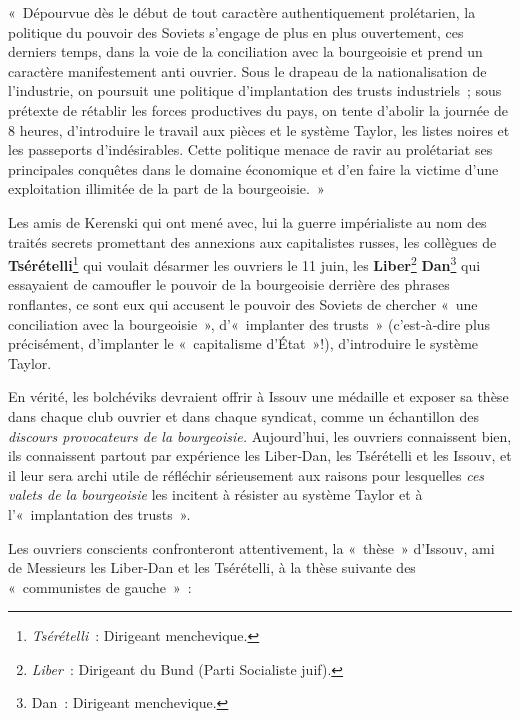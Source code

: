 \documentclass[french,twoside]{book} %
\def\mednobreak{\ifdim\lastskip<\medskipamount
  \removelastskip\nopagebreak\medskip\fi}
\newcommand{\labelblock}[1]{\medbreak{\noindent\color{rubric}\bfseries #1}\par\mednobreak}
\newenvironment{quoteblock}%
  {\begin{quoting}}
  {\end{quoting}}
\newenvironment{quotebar}{%
    \def\FrameCommand{{\color{rubric!10!}\vrule width 0.5em} \hspace{0.9em}}%
    \def\OuterFrameSep{\itemsep} %
    \MakeFramed {\advance\hsize-\width \FrameRestore}
  }%
  {%
    \endMakeFramed
  }
\renewenvironment{quoteblock}%
  {%
    \savenotes
    \setstretch{0.9}
    \normalfont
    \begin{quotebar}
  }
  {%
    \end{quotebar}
    \spewnotes
  }
\begin{document}
\begin{quoteblock}
 \noindent « Dépourvue dès le début de tout caractère authentiquement prolétarien, la politique du pouvoir des Soviets s’engage de plus en plus ouvertement, ces derniers temps, dans la voie de la conciliation avec la bourgeoisie et prend un caractère manifestement anti ouvrier. Sous le drapeau de la nationalisation de l’industrie, on poursuit une politique d’implantation des trusts industriels ; sous prétexte de rétablir les forces productives du pays, on tente d’abolir la journée de 8 heures, d’introduire le travail aux pièces et le système Taylor, les listes noires et les passeports d’indésirables. Cette politique menace de ravir au prolétariat ses principales conquêtes dans le domaine économique et d’en faire la victime d’une exploitation illimitée de la part de la bourgeoisie. »
\end{quoteblock}


\labelblock{N'est‑ce pas magnifique ?}

\noindent Les amis de Kerenski qui ont mené avec, lui la guerre impérialiste au nom des traités secrets promettant des annexions aux capitalistes russes, les collègues de \textbf{Tsérételli}\footnote{\emph{Tsérételli} : Dirigeant menchevique.} qui voulait désarmer les ouvriers le 11 juin, les \textbf{Liber}\footnote{\emph{Liber} : Dirigeant du Bund (Parti Socialiste juif).}\textbf{ Dan}\footnote{Dan : Dirigeant menchevique.} qui essayaient de camoufler le pouvoir de la bourgeoisie derrière des phrases ronflantes, ce sont eux qui accusent le pouvoir des Soviets de chercher « une conciliation avec la bourgeoisie », d’« implanter des trusts » (c’est‑à‑dire plus précisément, d’implanter le \hspace{1em}« capitalisme d’État »!), d’introduire le système Taylor.\par
En vérité, les bolchéviks devraient offrir à Issouv une médaille et exposer sa thèse dans chaque club ouvrier et dans chaque syndicat, comme un échantillon des \emph{discours provocateurs de la bourgeoisie.} Aujourd’hui, les ouvriers connaissent bien, ils connaissent partout par expérience les Liber‑Dan, les Tsérételli et les Issouv, et il leur sera archi utile de réfléchir sérieusement aux raisons pour lesquelles \emph{ces valets de la bourgeoisie} les incitent à résister au système Taylor et à l’« implantation des trusts ».\par
Les ouvriers conscients confronteront attentivement, la « thèse » d’Issouv, ami de Messieurs les Liber‑Dan et les Tsérételli, à la thèse suivante des « communistes de gauche » :\par
\end{document}
